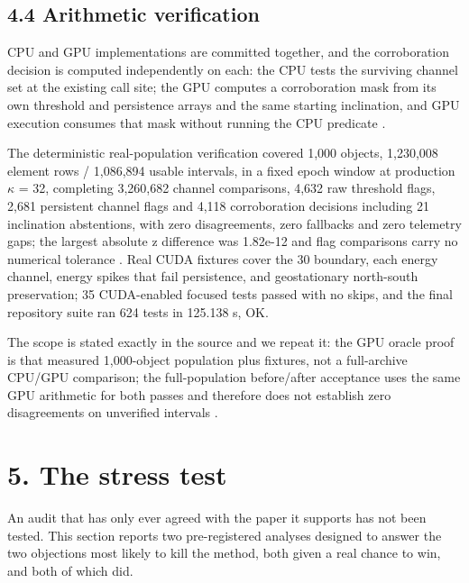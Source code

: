 \documentclass[11pt]{article}
\begin{document}
\subsection*{4.4 Arithmetic verification}

CPU and GPU implementations are committed together, and the corroboration decision is computed independently on each: the CPU tests the surviving channel set at the existing call site; the GPU computes a corroboration mask from its own threshold and persistence arrays and the same starting inclination, and GPU execution consumes that mask without running the CPU predicate%
.

The deterministic real-population verification covered 1,000 objects, 1,230,008 element rows / 1,086,894 usable intervals, in a fixed epoch window at production $\kappa$ = 32, completing 3,260,682 channel comparisons, 4,632 raw threshold flags, 2,681 persistent channel flags and 4,118 corroboration decisions including 21 inclination abstentions, with zero disagreements, zero fallbacks and zero telemetry gaps; the largest absolute z difference was 1.82e-12 and flag comparisons carry no numerical tolerance%
. Real CUDA fixtures cover the 30\textdegree{} boundary, each energy channel, energy spikes that fail persistence, and geostationary north-south preservation; 35 CUDA-enabled focused tests passed with no skips, and the final repository suite ran 624 tests in 125.138 s, OK.

The scope is stated exactly in the source and we repeat it: the GPU oracle proof is that measured 1,000-object population plus fixtures, not a full-archive CPU/GPU comparison; the full-population before/after acceptance uses the same GPU arithmetic for both passes and therefore does not establish zero disagreements on unverified intervals%
.

\section*{5. The stress test}

An audit that has only ever agreed with the paper it supports has not been tested. This section reports two pre-registered analyses designed to answer the two objections most likely to kill the method, both given a real chance to win, and both of which did.
\end{document}
